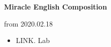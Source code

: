 \documentclass{article}
\begin{document}
    \centerline{\huge \bf Miracle English Composition}        %
    \vfill \vfill
        from 2020.02.18~
    \hfill
    \begin{itemize}
        \item LINK. Lab
    \end{itemize}

    \newpage

    \tableofcontents

    
    
    \medskip
\end{document}
